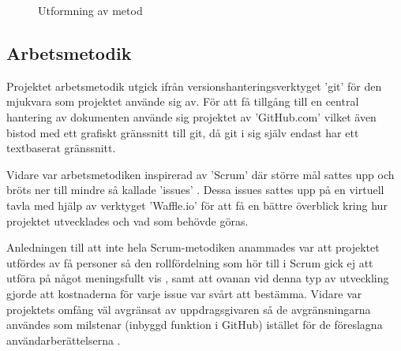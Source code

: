 \begin{figure}[b]
            \caption{\label{fig:method} Utformning av metod}
        \end{figure}


    \newpage

    \subsection{Arbetsmetodik} %
    \label{sub:arbetsmetodik}
        Projektet arbetsmetodik utgick ifrån versionshanteringsverktyget 'git' 
        för den mjukvara som projektet använde sig av. För att få tillgång 
        till en central hantering av dokumenten använde sig projektet av 'GitHub.com' vilket även bistod med ett grafiskt gränssnitt till git, då git i sig själv endast har ett textbaserat gränssnitt. \bigskip

        Vidare var arbetsmetodiken inspirerad av 'Scrum' där större mål sattes upp och bröts ner till mindre så kallade 'issues' \cite[kap.~8]{scrum}. Dessa issues sattes upp på en virtuell tavla med hjälp av verktyget 'Waffle.io' för att få en bättre överblick kring hur projektet utvecklades och vad som behövde göras. \bigskip

        Anledningen till att inte hela Scrum-metodiken anammades var att projektet utfördes av få personer så den rollfördelning som hör till i Scrum gick ej att utföra på något meningsfullt vis \cite[kap.~6]{scrum}, samt att ovanan vid denna typ av utveckling gjorde att kostnaderna för varje issue var svårt att bestämma. Vidare var projektets omfång väl avgränsat av uppdrags\-givaren så de avgränsningarna användes som milstenar (inbyggd funktion i GitHub) istället för de föreslagna användarberättelserna \cite[kap.~9]{scrum}. 

